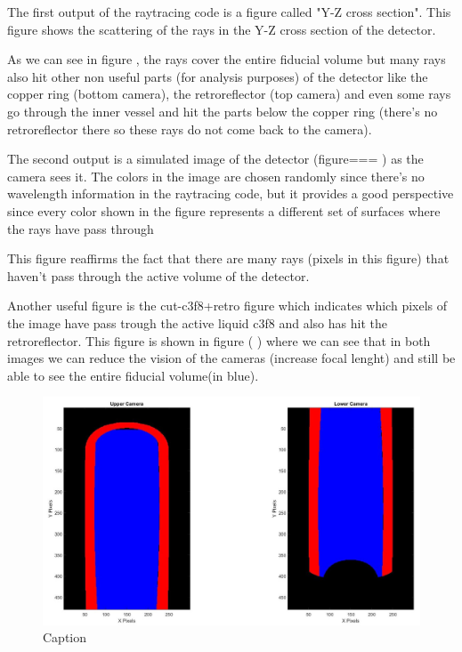 \documentclass{article}
\begin{document}
The first output of the raytracing code is a figure called "Y-Z cross section". This figure shows the scattering of the rays in the Y-Z cross section of the detector.

As we can see in figure , the rays cover the entire fiducial volume but many rays also hit other non useful parts (for analysis purposes) of the detector like the copper ring (bottom camera), the retroreflector (top camera) and even some rays go through the inner vessel and hit the parts below the copper ring (there's no retroreflector there so these rays do not come back to the camera).


The second output is a simulated image of the detector (figure=== ) as the camera sees it. The colors in the image are chosen randomly since there's no wavelength information in the raytracing code, but it provides a good perspective since every color shown in the figure represents a different set of surfaces where the rays have pass through

This figure reaffirms the fact that there are many rays (pixels in this figure) that haven't pass through the active volume of the detector.

Another useful figure is the cut-c3f8+retro figure which indicates which pixels of the image have pass trough the active liquid c3f8 and also has hit the retroreflector. This figure is shown in figure ( ) where we can see that in both images we can reduce the vision of the cameras (increase focal lenght) and still be able to see the entire fiducial volume(in blue).



\begin{figure}
    \centering
    \includegraphics[width=12cm]{cut_c3f8+retro_copper_over_cyl_IIV_original_mathieu.jpg}
    \caption{Caption}
    \label{fig:my_label}
\end{figure}
\end{document}
